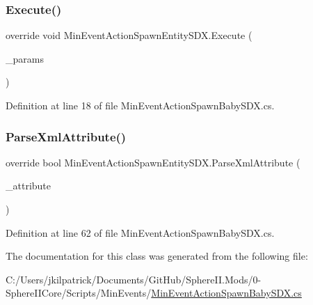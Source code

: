 \subsubsection{\texorpdfstring{Execute()}{Execute()}}
{\footnotesize\ttfamily override void Min\+Event\+Action\+Spawn\+Entity\+S\+D\+X.\+Execute (\begin{DoxyParamCaption}\item[{Min\+Event\+Params}]{\+\_\+params }\end{DoxyParamCaption})}



Definition at line 18 of file Min\+Event\+Action\+Spawn\+Baby\+S\+D\+X.\+cs.

\mbox{\label{class_min_event_action_spawn_entity_s_d_x_a389a7121b78b6fa55999a29d77b7886e}} 
\subsubsection{\texorpdfstring{ParseXmlAttribute()}{ParseXmlAttribute()}}
{\footnotesize\ttfamily override bool Min\+Event\+Action\+Spawn\+Entity\+S\+D\+X.\+Parse\+Xml\+Attribute (\begin{DoxyParamCaption}\item[{Xml\+Attribute}]{\+\_\+attribute }\end{DoxyParamCaption})}



Definition at line 62 of file Min\+Event\+Action\+Spawn\+Baby\+S\+D\+X.\+cs.



The documentation for this class was generated from the following file\+:\begin{DoxyCompactItemize}
\item 
C\+:/\+Users/jkilpatrick/\+Documents/\+Git\+Hub/\+Sphere\+I\+I.\+Mods/0-\/\+Sphere\+I\+I\+Core/\+Scripts/\+Min\+Events/\mbox{\hyperlink{_min_event_action_spawn_baby_s_d_x_8cs}{Min\+Event\+Action\+Spawn\+Baby\+S\+D\+X.\+cs}}\end{DoxyCompactItemize}

